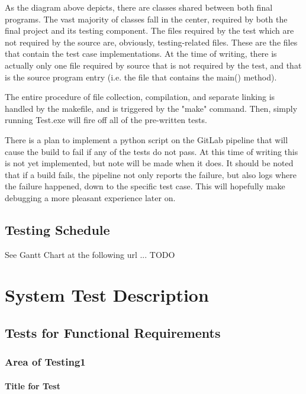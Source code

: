 \documentclass[12pt, titlepage]{article}
\begin{document}
	\bigskip
	\bigskip

	As the diagram above depicts, there are classes shared between both final programs. The vast majority of classes fall in the center, required by both the final project and its testing component. The files required by the test which are not required by the source are, obviously, testing-related files. These are the files that contain the test case implementations. At the time of writing, there is actually only one file required by source that is not required by the test, and that is the source program entry (i.e. the file that contains the main() method).

	\bigskip

	The entire procedure of file collection, compilation, and separate linking is handled by the makefile, and is triggered by the "make" command. Then, simply running Test.exe will fire off all of the pre-written tests.

	\bigskip

	There is a plan to implement a python script on the GitLab pipeline that will cause the build to fail if any of the tests do not pass. At this time of writing this is not yet implemented, but note will be made when it does. It should be noted that if a build fails, the pipeline not only reports the failure, but also logs where the failure happened, down to the specific test case. This will hopefully make debugging a more pleasant experience later on.

	\subsection{Testing Schedule}
		
	See Gantt Chart at the following url ... TODO

\section{System Test Description}
	
	\subsection{Tests for Functional Requirements}

		\subsubsection{Area of Testing1}
				
		\paragraph{Title for Test}
\end{document}
